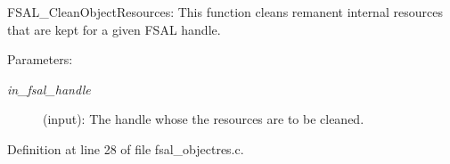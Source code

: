 FSAL\_\-CleanObjectResources: This function cleans remanent internal resources that are kept for a given FSAL handle.

\begin{Desc}
\item[Parameters:]
\begin{description}
\item[{\em in\_\-fsal\_\-handle}](input): The handle whose the resources are to be cleaned. \end{description}
\end{Desc}


Definition at line 28 of file fsal\_\-objectres.c.
